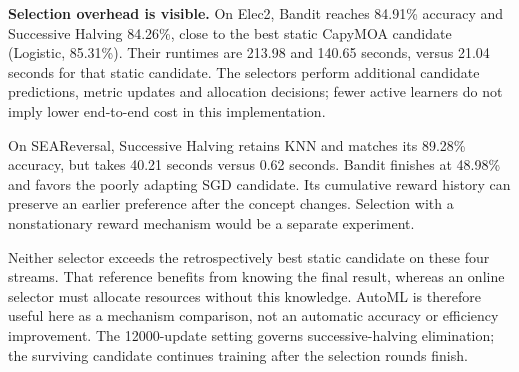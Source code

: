 \textbf{Selection overhead is visible.} On Elec2, Bandit reaches 84.91\% accuracy and Successive Halving 84.26\%, close to the best static CapyMOA candidate (Logistic, 85.31\%). Their runtimes are 213.98 and 140.65 seconds, versus 21.04 seconds for that static candidate. The selectors perform additional candidate predictions, metric updates and allocation decisions; fewer active learners do not imply lower end-to-end cost in this implementation.

On SEAReversal, Successive Halving retains KNN and matches its 89.28\% accuracy, but takes 40.21 seconds versus 0.62 seconds. Bandit finishes at 48.98\% and favors the poorly adapting SGD candidate. Its cumulative reward history can preserve an earlier preference after the concept changes. Selection with a nonstationary reward mechanism would be a separate experiment.

Neither selector exceeds the retrospectively best static candidate on these four streams. That reference benefits from knowing the final result, whereas an online selector must allocate resources without this knowledge. AutoML is therefore useful here as a mechanism comparison, not an automatic accuracy or efficiency improvement. The 12000-update setting governs successive-halving elimination; the surviving candidate continues training after the selection rounds finish.
